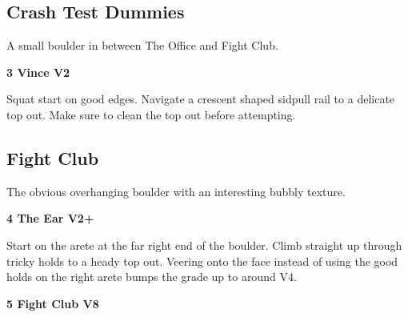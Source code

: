 \begin{multicols}{2}
\begin{minipage}{\columnwidth}
			\subsection*{Crash Test Dummies}\label{bf:Crash Test Dummies}
			A small boulder in between The Office and Fight Club.
			
			\end{minipage}
			
					\begin{minipage}{\linewidth}	
					\label{rt:Vince}
\colorbox{green!20}{
\parbox{0.95\textwidth}{
\textbf{
3 Vince V2    
}
}
}

					\begin{adjustwidth}{0.5cm}{}				
					Squat start on good edges. Navigate a crescent shaped sidpull rail to a delicate top out. Make sure to clean the top out before attempting.
					\end{adjustwidth}
					\end{minipage}
			\begin{minipage}{\columnwidth}
			\subsection*{Fight Club}\label{bf:Fight Club}
			The obvious overhanging boulder with an interesting bubbly texture.
			
\label{pt:Fight Club}
			\end{minipage}
			

					\begin{minipage}{\linewidth}	
					\label{rt:The Ear}
\colorbox{green!20}{
\parbox{0.95\textwidth}{
\textbf{
4 The Ear V2+     
}
}
}

					\begin{adjustwidth}{0.5cm}{}				
					Start on the arete at the far right end of the boulder. Climb straight up through tricky holds to a heady top out. Veering onto the face instead of using the good holds on the right arete bumps the grade up to around V4.
					\end{adjustwidth}
					\end{minipage}
					\begin{minipage}{\linewidth}	
					\label{rt:Fight Club}
\colorbox{Goldenrod!50}{
\parbox{0.95\textwidth}{
\textbf{
5 Fight Club V8     
}
}
}


\end{minipage}
\end{multicols}
